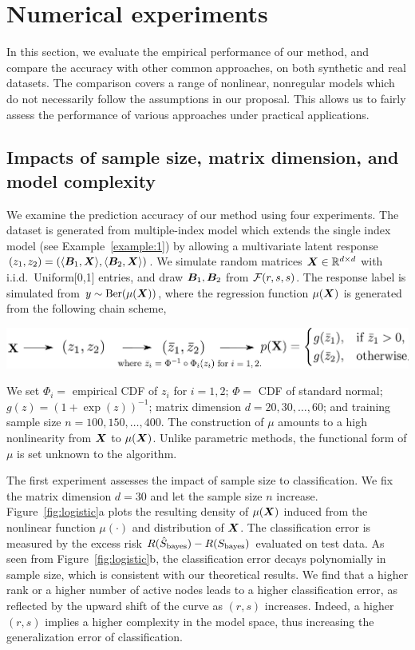 \documentclass[11pt]{article}
\theoremstyle{plain}
\theoremstyle{definition}
\def\bayesS{S_{\textup{bayes}}}
\begin{document}
\section{Numerical experiments}\label{sec:simulation}
In this section, we evaluate the empirical performance of our method, and compare the accuracy with other common approaches, on both synthetic and real datasets. The comparison covers a range of nonlinear, nonregular models which do not necessarily follow the assumptions in our proposal. This allows us to fairly assess the performance of various approaches under practical applications. 

\subsection{Impacts of sample size, matrix dimension, and model complexity}\label{sec:validation}
We examine the prediction accuracy of our method using four experiments. The dataset is generated from multiple-index model which extends the single index model (see Example~\ref{example:1}) by allowing a multivariate latent response $(z_1,z_2)=\left(\langle \bm B_1, \bm X \rangle,\langle \bm B_2, \bm X \rangle\right)$. We simulate random matrices $\bm X\in\mathbb{R}^{d\times d}$ with i.i.d.\ Uniform[0,1] entries, and draw $\bm B_1, \bm B_2$ from $\mathcal{F}(r,s,s)$. The response label is simulated from $y\sim \text{Ber}(\mu(\bm X))$, where the regression function $\mu(\bm X)$ is generated from the following chain scheme,

\vspace{.3cm}
\centerline{\includegraphics[width=.7\textwidth]{math.pdf}}

We set $\Phi_i = $ empirical CDF of $z_i$ for $i=1,2$; $\Phi = $ CDF of standard normal; $g(z)=(1+\exp(z))^{-1}$; matrix dimension $d=20,30,\ldots,60$; and training sample size $n=100, 150, \ldots, 400$. The construction of $\mu$ amounts to a high nonlinearity from $\bm X$ to $\mu(\bm X)$. Unlike parametric methods, the functional form of $\mu$ is set unknown to the algorithm. 

The first experiment assesses the impact of sample size to classification. We fix the matrix dimension $d=30$ and let the sample size $n$ increase. Figure~\ref{fig:logistic}a plots the resulting density of $\mu(\bm X)$ induced from the nonlinear function $\mu(\cdot)$ and distribution of $\bm X$. The classification error is measured by the excess risk $R(\hat S_{\text{bayes}})-R(\bayesS)$ evaluated on test data. As seen from Figure~\ref{fig:logistic}b, the classification error decays polynomially in sample size, which is consistent with our theoretical results. We find that a higher rank or a higher number of active nodes leads to a higher classification error, as reflected by the upward shift of the curve as $(r,s)$ increases. Indeed, a higher $(r,s)$ implies a higher complexity in the model space, thus increasing the generalization error of classification. 
\end{document}
